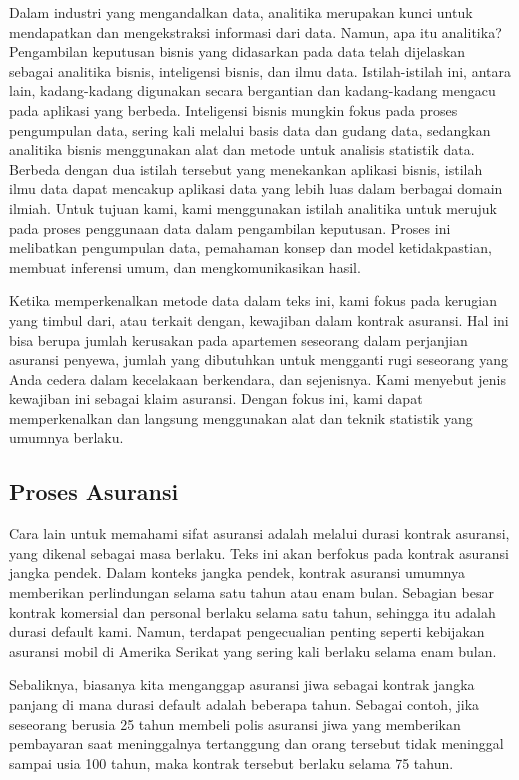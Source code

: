 \documentclass[
]{book}
\begin{document}
Dalam industri yang mengandalkan data, analitika merupakan kunci untuk mendapatkan dan mengekstraksi informasi dari data. Namun, apa itu analitika? Pengambilan keputusan bisnis yang didasarkan pada data telah dijelaskan sebagai analitika bisnis, inteligensi bisnis, dan ilmu data. Istilah-istilah ini, antara lain, kadang-kadang digunakan secara bergantian dan kadang-kadang mengacu pada aplikasi yang berbeda. Inteligensi bisnis mungkin fokus pada proses pengumpulan data, sering kali melalui basis data dan gudang data, sedangkan analitika bisnis menggunakan alat dan metode untuk analisis statistik data. Berbeda dengan dua istilah tersebut yang menekankan aplikasi bisnis, istilah ilmu data dapat mencakup aplikasi data yang lebih luas dalam berbagai domain ilmiah. Untuk tujuan kami, kami menggunakan istilah analitika untuk merujuk pada proses penggunaan data dalam pengambilan keputusan. Proses ini melibatkan pengumpulan data, pemahaman konsep dan model ketidakpastian, membuat inferensi umum, dan mengkomunikasikan hasil.

Ketika memperkenalkan metode data dalam teks ini, kami fokus pada kerugian yang timbul dari, atau terkait dengan, kewajiban dalam kontrak asuransi. Hal ini bisa berupa jumlah kerusakan pada apartemen seseorang dalam perjanjian asuransi penyewa, jumlah yang dibutuhkan untuk mengganti rugi seseorang yang Anda cedera dalam kecelakaan berkendara, dan sejenisnya. Kami menyebut jenis kewajiban ini sebagai klaim asuransi. Dengan fokus ini, kami dapat memperkenalkan dan langsung menggunakan alat dan teknik statistik yang umumnya berlaku.

\hypertarget{proses-asuransi}{%
\subsection{Proses Asuransi}\label{proses-asuransi}}

Cara lain untuk memahami sifat asuransi adalah melalui durasi kontrak asuransi, yang dikenal sebagai masa berlaku. Teks ini akan berfokus pada kontrak asuransi jangka pendek. Dalam konteks jangka pendek, kontrak asuransi umumnya memberikan perlindungan selama satu tahun atau enam bulan. Sebagian besar kontrak komersial dan personal berlaku selama satu tahun, sehingga itu adalah durasi default kami. Namun, terdapat pengecualian penting seperti kebijakan asuransi mobil di Amerika Serikat yang sering kali berlaku selama enam bulan.

Sebaliknya, biasanya kita menganggap asuransi jiwa sebagai kontrak jangka panjang di mana durasi default adalah beberapa tahun. Sebagai contoh, jika seseorang berusia 25 tahun membeli polis asuransi jiwa yang memberikan pembayaran saat meninggalnya tertanggung dan orang tersebut tidak meninggal sampai usia 100 tahun, maka kontrak tersebut berlaku selama 75 tahun.
\end{document}
